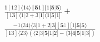 \documentclass[varwidth, border=5pt]{standalone}
\begin{document}
\begin{my}
$\begin{gathered}
\scriptscriptstyle\frac{1[12]⟨14⟩[𝟓1][1|𝟓|𝟓⟩}{[13]⟨1|2+3|1]⟨1|𝟓|1]} +\\
\scriptscriptstyle\frac{-1⟨34⟩⟨3|1+2|3][𝟓1][1|𝟓|𝟓⟩}{[13]⟨23⟩(⟨2|3|𝟓|1|2]-⟨3|4|𝟓|1|3])} \phantom{+}
\end{gathered}$
\end{my}
\end{document}
